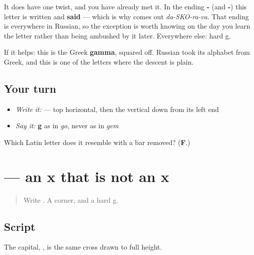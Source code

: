 It does have one twist, and you have already met it. In the ending \textbf{-} (and \textbf{-}) this letter is written  and \textbf{said } — which is why \emph{ } comes out \emph{da-SKO-ra-va}. That ending is everywhere in Russian, so the exception is worth knowing on the day you learn the letter rather than being ambushed by it later. Everywhere else: hard g.

If it helps: this is the Greek \textbf{gamma}, squared off. Russian took its alphabet from Greek, and this is one of the letters where the descent is plain.

\subsection*{Your turn}
\begin{itemize}
\raggedright
  \item \emph{Write it:}  — top horizontal, then the vertical down from its left end
  \item \emph{Say it:} \textbf{g} as in \emph{go}, never as in \emph{gem}
\end{itemize}

\begin{tcolorbox}[breakable,colback=teal!4,colframe=teal!35!black,title={Before you move on}]
Which Latin letter does it resemble with a bar removed? (\textbf{F}.)
\end{tcolorbox}
\section[\texorpdfstring{\ru{х} (kh)}{х (kh)}]{ — an x that is not an x}

\label{lesson:RU-W07-kh}



\begin{quote}
Write . A corner, and a hard g.
\end{quote}

\subsection*{Script}

\begin{quote}
   
\end{quote}

The capital, \textbf{}, is the same cross drawn to full height.

